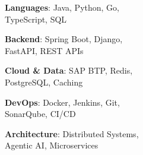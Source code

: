 \begin{skillsbullets}
    \item \textbf{Languages}: Java, Python, Go,\\TypeScript, SQL
    \item \textbf{Backend}: Spring Boot, Django,\\FastAPI, REST APIs
    \item \textbf{Cloud \& Data}: SAP BTP, Redis,\\PostgreSQL, Caching
    \item \textbf{DevOps}: Docker, Jenkins, Git,\\SonarQube, CI/CD
    \item \textbf{Architecture}: Distributed Systems,\\Agentic AI, Microservices
\end{skillsbullets}

\resumedivider
